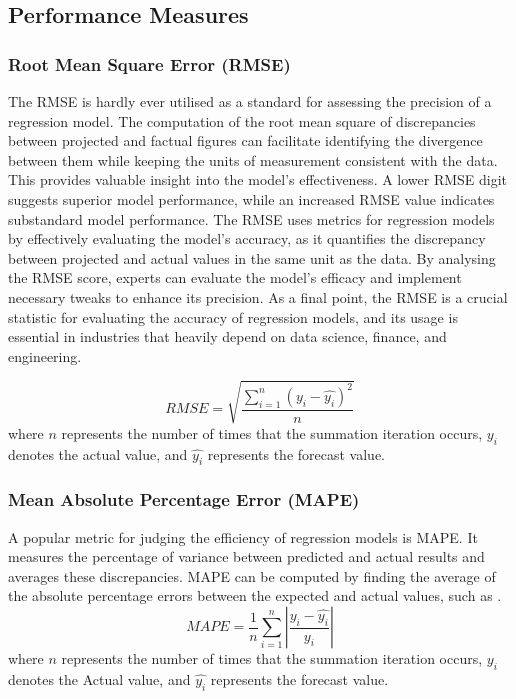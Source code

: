 \documentclass[a4paper, fleqn]{cas-sc}
\theoremstyle{definition}
\theoremstyle{remark}
\begin{document}
\subsection{ Performance Measures}
\subsubsection{Root Mean Square Error (RMSE) }
The RMSE is hardly ever utilised as a standard for assessing the precision of a regression model. The computation of the root mean square of discrepancies between projected and factual figures can facilitate identifying the divergence between them while keeping the units of measurement consistent with the data. This provides valuable insight into the model's effectiveness. A lower RMSE digit suggests superior model performance,  while an increased RMSE value indicates substandard model performance. The RMSE  uses metrics for regression models by effectively evaluating the model's accuracy,  as it quantifies the discrepancy between projected and actual values in the same unit as the data. By analysing the RMSE score,  experts can evaluate the model's efficacy and implement necessary tweaks to enhance its precision. As a final point,  the RMSE is a crucial statistic for evaluating the accuracy of regression models,  and its usage is essential in industries that heavily depend on data science,  finance,  and engineering.



\begin{equation} \label{rmsee}
RMSE=\sqrt{\frac{\sum_{i=1}^{n}(y_{i}-\hat{y_{i}})^2}{n}}
\end{equation}
where $n$ represents the number of times that the summation iteration occurs,  \begin{math} y_{i} \end{math} denotes the actual value,  and \begin{math}\hat{y_{i}}\end{math} represents the forecast value.




\subsubsection{ Mean Absolute Percentage Error (MAPE)}
A popular metric for judging the efficiency of regression models is MAPE. It measures the percentage of variance between predicted and actual results and averages these discrepancies. MAPE can be computed by finding the average of the absolute percentage errors between the expected and actual values,  such as .
\begin{equation} \label{mapee}
MAPE=\frac{1}{n}\sum_{i=1}^{n} \left | \frac{y_{i}-\hat{y_{i}}}{y_{i}} \right |
\end{equation}
where $n$ represents the number of times that the summation iteration occurs,  \begin{math} y_{i} \end{math} denotes the Actual value,  and \begin{math}\hat{y_{i}}\end{math} represents the forecast value.
\end{document}
